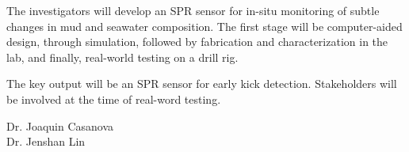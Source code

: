 The investigators will develop an SPR sensor for in-situ monitoring of subtle changes in mud and seawater composition. The first stage will be computer-aided design, through simulation, followed by fabrication and characterization in the lab, and finally, real-world testing on a drill rig.


The key output will be an SPR sensor for early kick detection. Stakeholders will be involved at the time of real-word testing.


\begin{description}
\item[Dr. Joaquin Casanova]
\item[Dr. Jenshan Lin]
\item[]
\end{description}
